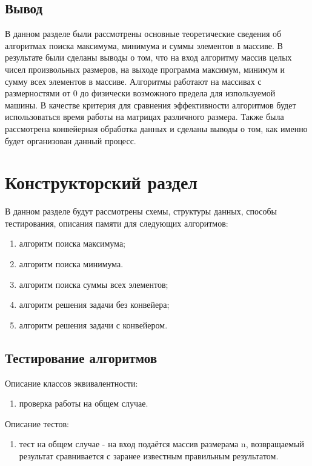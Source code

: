 \section{Вывод}
В данном разделе были рассмотрены основные теоретические сведения об алгоритмах поиска максимума, минимума и суммы элементов в массиве. В результате были сделаны выводы о том, что на вход алгоритму массив целых чисел произвольных размеров, на выходе программа максимум, минимум и сумму всех элементов в массиве. Алгоритмы работают на массивах с размерностями от 0 до физически возможного предела для изпользуемой машины. В качестве критерия для сравнения эффективности алгоритмов будет использоваться время работы на матрицах различного размера. Также была рассмотрена конвейерная обработка данных и сделаны выводы о том, как именно будет организован данный процесс.

\chapter{Конструкторский раздел}

В данном разделе будут рассмотрены схемы, структуры данных, способы тестирования, описания памяти для следующих алгоритмов:
\begin{enumerate}
	\item алгоритм поиска максимума;
	\item алгоритм поиска минимума.
	\item алгоритм поиска суммы всех элементов;
	\item алгоритм решения задачи без конвейера;
	\item алгоритм решения задачи с конвейером.
\end{enumerate}

\section{Тестирование алгоритмов}

Описание классов эквивалентности:
\begin{enumerate}
	\item проверка работы на общем случае.
\end{enumerate}

Описание тестов:
\begin{enumerate}
	\item тест на общем случае - на вход подаётся массив размерама n, возвращаемый результат сравнивается с заранее известным правильным результатом.
\end{enumerate}

